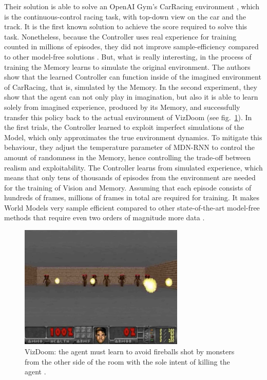 Their solution is able to solve an OpenAI Gym's CarRacing environment \cite{Code.OpenAIGym}, which is the continuous-control racing task, with top-down view on the car and the track. It is the first known solution to achieve the score required to solve this task. Nonetheless, because the Controller uses real experience for training counted in millions of episodes, they did not improve sample-efficiency compared to other model-free solutions \cite{Algo.CarRacingA3C}. But, what is really interesting, in the process of training the Memory learns to simulate the original environment. The authors show that the learned Controller can function inside of the imagined environment of CarRacing, that is, simulated by the Memory.
In the second experiment, they show that the agent can not only play in imagination, but also it is able to learn solely from imagined experience, produced by its Memory, and successfully transfer this policy back to the actual environment of VizDoom (see fig.~\ref{Fig.VizDoom}). In the first trials, the Controller learned to exploit imperfect simulations of the Model, which only approximates the true environment dynamics. To mitigate this behaviour, they adjust the temperature parameter of MDN-RNN to control the amount of randomness in the Memory, hence controlling the trade-off between realism and exploitability.
The Controller learns from simulated experience, which means that only tens of thousands of episodes from the environment are needed for the training of Vision and Memory. Assuming that each episode consists of hundreds of frames, millions of frames in total are required for training. It makes World Models very sample efficient compared to other state-of-the-art model-free methods that require even two orders of magnitude more data \cite{Algo.A3C}.

\begin{figure}[H]
\includegraphics[width=0.7\textwidth,keepaspectratio]{figures/VizDoom.png}
\caption[VizDoom]{VizDoom: the agent must learn to avoid fireballs shot by monsters from the other side of the room with the sole intent of killing the agent \protect\cite{Algo.WorldModels}.}
\label{Fig.VizDoom}
\end{figure}

